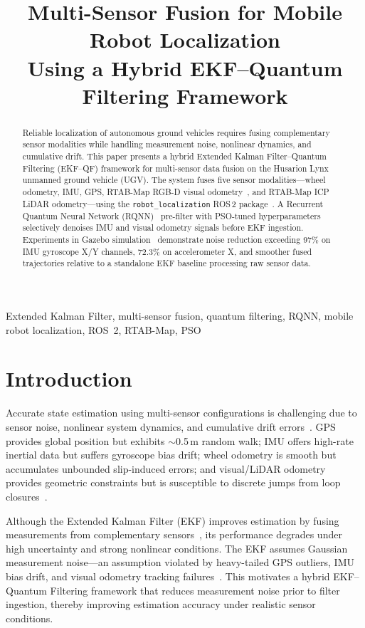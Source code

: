 \documentclass[conference]{IEEEtran}
\title{Multi-Sensor Fusion for Mobile Robot Localization\\
Using a Hybrid EKF--Quantum Filtering Framework}
\author{
  \IEEEauthorblockN{Anish Kumar,\; Sachit Bansal,\; Somanshu Juneja}
  \IEEEauthorblockA{%
    \textit Under the Guidance of Dr.\ Radhe Shyam
  }
}
\begin{document}
\maketitle

\begin{abstract}
Reliable localization of autonomous ground vehicles requires fusing complementary
sensor modalities while handling measurement noise, nonlinear dynamics, and
cumulative drift. This paper presents a hybrid Extended Kalman Filter--Quantum
Filtering (EKF--QF) framework for multi-sensor data fusion on the Husarion Lynx
unmanned ground vehicle (UGV). The system fuses five sensor modalities---wheel
odometry, IMU, GPS, RTAB-Map RGB-D visual odometry~\cite{forster2017}, and
RTAB-Map ICP LiDAR odometry---using the \texttt{robot\_localization} ROS\,2
package~\cite{robotlocalization}. A Recurrent Quantum Neural Network
(RQNN)~\cite{gandhi2014} pre-filter with PSO-tuned hyperparameters selectively
denoises IMU and visual odometry signals before EKF ingestion. Experiments in
Gazebo simulation~\cite{gazebo} demonstrate noise reduction exceeding 97\% on IMU gyroscope
X/Y channels, 72.3\% on accelerometer X, and smoother fused trajectories relative
to a standalone EKF baseline processing raw sensor data.
\end{abstract}

\begin{IEEEkeywords}
Extended Kalman Filter, multi-sensor fusion, quantum filtering, RQNN, mobile robot
localization, ROS~2, RTAB-Map, PSO
\end{IEEEkeywords}

\section{Introduction}

Accurate state estimation using multi-sensor configurations is challenging due to
sensor noise, nonlinear system dynamics, and cumulative drift
errors~\cite{mourikis2007,hesch2013}. GPS provides global position but exhibits
$\sim$0.5\,m random walk; IMU offers high-rate inertial data but suffers gyroscope
bias drift; wheel odometry is smooth but accumulates unbounded slip-induced errors;
and visual/LiDAR odometry provides geometric constraints but is susceptible to
discrete jumps from loop closures~\cite{zhang2014,shan2020}.

Although the Extended Kalman Filter (EKF) improves estimation by fusing
measurements from complementary sensors~\cite{kalmanfilter,chen2019}, its
performance degrades under high uncertainty and strong nonlinear conditions. The
EKF assumes Gaussian measurement noise---an assumption violated by heavy-tailed GPS
outliers, IMU bias drift, and visual odometry tracking
failures~\cite{huang2013,dhoedt2014}. This motivates a hybrid EKF--Quantum
Filtering framework that reduces measurement noise prior to filter ingestion,
thereby improving estimation accuracy under realistic sensor conditions.
\end{document}
